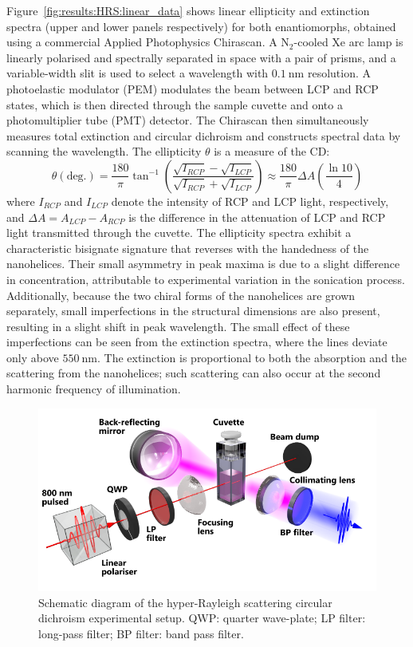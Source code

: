 Figure~\ref{fig:results:HRS:linear_data} shows linear ellipticity and extinction spectra (upper and lower panels respectively) for both enantiomorphs, obtained using a commercial Applied Photophysics Chirascan. A $\text{N}_2$-cooled Xe arc lamp is linearly polarised and spectrally separated in space with a pair of prisms, and a variable-width slit is used to select a wavelength with $\SI{0.1}{\nano\m}$ resolution. A photoelastic modulator (PEM) modulates the beam between LCP and RCP states, which is then directed through the sample cuvette and onto a photomultiplier tube (PMT) detector. The Chirascan then simultaneously measures total extinction and circular dichroism and constructs spectral data by scanning the wavelength.
The ellipticity $\theta$ is a measure of the CD:
\begin{equation}
    \theta (\text{deg.}) = \frac{180}{\pi} \tan^{-1}\left( \frac{\sqrt{I_{RCP}} - \sqrt{I_{LCP}}}{\sqrt{I_{RCP}} + \sqrt{I_{LCP}}} \right) \approx \frac{180}{\pi} \Delta A \left( \frac{\ln 10}{4} \right)
\end{equation}
where $I_{RCP}$ and $I_{LCP}$ denote the intensity of RCP and LCP light, respectively, and $\Delta A = A_{LCP} - A_{RCP}$ is the difference in the attenuation of LCP and RCP light transmitted through the cuvette. 
The ellipticity spectra exhibit a characteristic bisignate signature that reverses with the handedness of the nanohelices. Their small asymmetry in peak maxima is due to a slight difference in concentration, attributable to experimental variation in the sonication process. Additionally, because the two chiral forms of the nanohelices are grown separately, small imperfections in the structural dimensions are also present, resulting in a slight shift in peak wavelength. The small effect of these imperfections can be seen from the extinction spectra, where the lines deviate only above $\SI{550}{\nano\m}$. The extinction is proportional to both the absorption and the scattering from the nanohelices; such scattering can also occur at the second harmonic frequency of illumination. 

\begin{figure}[htb!]	
    \centering	
    \includegraphics[scale=1]{./figures/results/HRS/experiment_schematic.pdf}
    \caption{\label{fig:results:HRS:experiment_schematic}
    Schematic diagram of the hyper-Rayleigh scattering circular dichroism experimental setup. QWP: quarter wave-plate; LP filter: long-pass filter; BP filter: band pass filter. }	
\end{figure}

